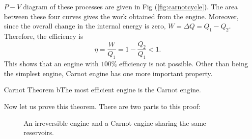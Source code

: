         $P-V$ diagram of these processes are given in Fig (\ref{fig:carnotcycle}). The area between these four curves gives the work obtained from the engine. Moreover, since the overall change in the internal energy is zero, $W=\Delta Q = Q_1-Q_2$. Therefore, the efficiency is 
        \begin{equation}
            \eta = \frac{W}{Q_1}= 1-\frac{Q_2}{Q_1} < 1.
        \end{equation}
        This shows that an engine with $100\%$ efficiency is not possible. Other than being the simplest engine, Carnot engine has one more important property.
        \begin{theorem}{Carnot Theorem}
            bThe most efficient engine is the Carnot engine.
        \end{theorem}
        Now let us prove this theorem. There are two parts to this proof: \\
        \begin{figure}
            \centering
             \caption{An irreversible engine and a Carnot engine sharing the same reservoirs.}
             \label{fig:irrevcarnot}
        \end{figure}
